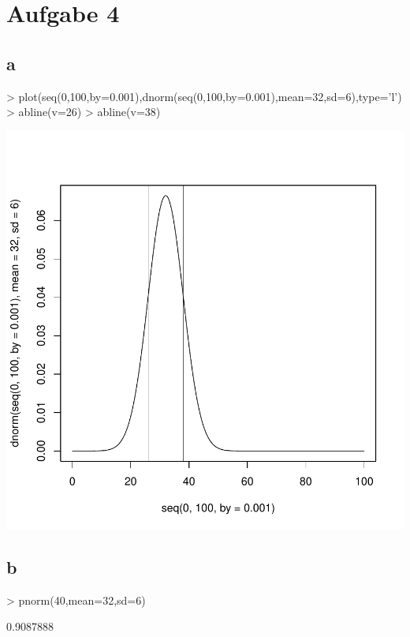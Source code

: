 

\section{Aufgabe 4}

\subsection{a}
\begin{Schunk}
\begin{Sinput}
> plot(seq(0,100,by=0.001),dnorm(seq(0,100,by=0.001),mean=32,sd=6),type='l')
> abline(v=26)
> abline(v=38)
\end{Sinput}
\end{Schunk}
\includegraphics{sw07_4-001}

\subsection{b}
\begin{Schunk}
\begin{Sinput}
> pnorm(40,mean=32,sd=6)
\end{Sinput}
\begin{Soutput}
[1] 0.9087888
\end{Soutput}
\end{Schunk}

